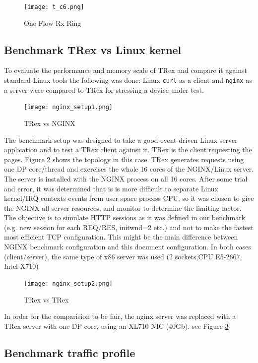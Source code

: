 \documentclass[conference]{IEEEtran}
\begin{document}
\begin{figure}[h]
  \texttt{[image: t\_c6.png]}
  \caption{One Flow Rx Ring}
  \label{fig:rx_ring}
\end{figure}


\subsection{Benchmark  TRex vs Linux kernel}

To evaluate the performance and memory scale of TRex and compare it against standard Linux tools the following was done: 
Linux \texttt{curl} as a client and \texttt{nginx} as a server were compared to TRex for stressing a device under test.

\begin{figure}[h]
  \texttt{[image: nginx\_setup1.png]}
  \caption{TRex vs NGINX}
  \label{fig:trex_nginx}
\end{figure}

The benchmark setup was designed to take a good event-driven Linux server application and to test a TRex client against it. 
TRex is the client requesting the pages. Figure \ref{fig:trex_nginx} shows the topology in this case.
TRex generates requests using one DP core/thread and exercises the whole 16 cores of the NGINX/Linux server. 
The server is installed with the NGINX process on all 16 cores.  
After some trial and error, it was determined that is is more difficult to separate Linux kernel/IRQ contexts events from user space process CPU, 
so it was chosen to give the NGINX all server resources, and monitor to determine the limiting factor.
The objective is to simulate HTTP sessions as it was defined in our benchmark (e.g. new session for each REQ/RES, initwnd=2 etc.) 
and not to make the fastest most efficient TCP configuration. 
This might be the main difference between NGINX benchmark configuration and this document configuration. 
In both cases (client/server), the same type of x86 server was used (2 sockets,CPU E5-2667, Intel X710)

\begin{figure}[h]
  \texttt{[image: nginx\_setup2.png]}
  \caption{TRex vs TRex}
  \label{fig:trex_vs_trex}
\end{figure}

In order for the comparision to be fair, the nginx server was replaced with a TRex server with one DP core, using an XL710 NIC (40Gb). 
see Figure \ref{fig:trex_vs_trex}

\subsection{Benchmark traffic profile}
\end{document}
